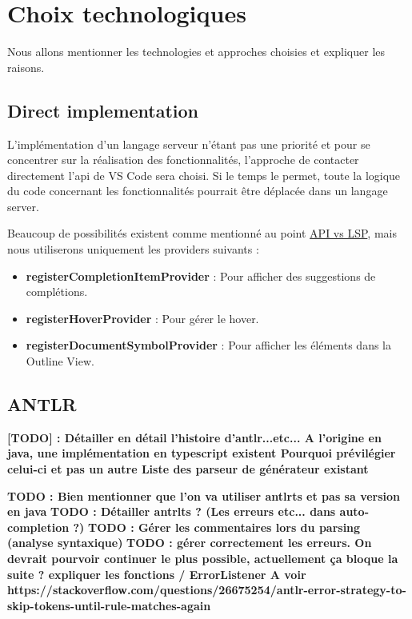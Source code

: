 \documentclass[
    iict, %
    il, %
]{heig-tb}
\begin{document}
\section{Choix technologiques}
Nous allons mentionner les technologies et approches choisies et expliquer les raisons.

\subsection{Direct implementation}
L'implémentation d'un langage serveur n'étant pas une priorité et pour se concentrer sur la réalisation des fonctionnalités, l'approche de contacter directement l'api de VS Code sera choisi.
Si le temps le permet, toute la logique du code concernant les fonctionnalités pourrait être déplacée dans un langage server.

Beaucoup de possibilités existent comme mentionné au point \hyperref[api vs lsp]{API vs LSP}, mais nous utiliserons uniquement les providers suivants :

\begin{itemize}
    \item \textbf{registerCompletionItemProvider} : Pour afficher des suggestions de complétions.
    \item \textbf{registerHoverProvider} : Pour gérer le hover.
    \item \textbf{registerDocumentSymbolProvider} : Pour afficher les éléments dans la Outline View.
\end{itemize}

\subsection{ANTLR}

\textbf{[TODO] : Détailler en détail l'histoire d'antlr...etc...
    A l'origine en java, une implémentation en typescript existent
    Pourquoi prévilégier celui-ci et pas un autre
    Liste des parseur de générateur existant
}

\textbf{TODO : Bien mentionner que l'on va utiliser antlrts et pas sa version en java}
\textbf{TODO : Détailler antrlts ? (Les erreurs etc... dans auto-completion ?)}
\textbf{TODO : Gérer les commentaires lors du parsing (analyse syntaxique)}
\textbf{TODO : gérer correctement les erreurs. On devrait pourvoir continuer le plus possible, actuellement ça bloque la suite ?
    expliquer les fonctions / ErrorListener
    A voir https://stackoverflow.com/questions/26675254/antlr-error-strategy-to-skip-tokens-until-rule-matches-again
}
\end{document}
